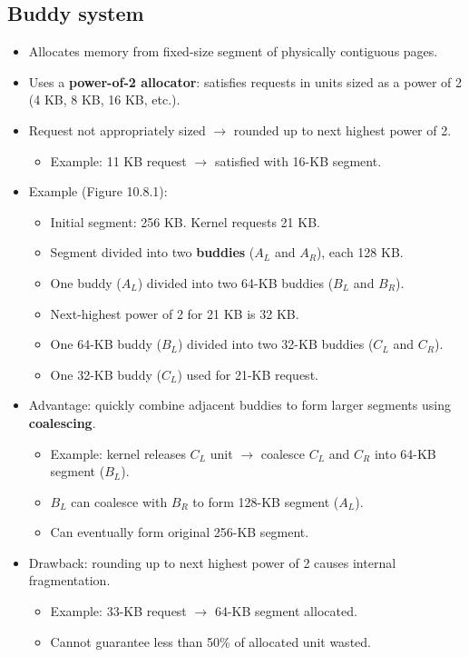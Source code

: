 \subsection{Buddy system}
\begin{itemize}
    \item Allocates memory from fixed-size segment of physically contiguous pages.
    \item Uses a \textbf{power-of-2 allocator}: satisfies requests in units sized as a power of 2 (4 KB, 8 KB, 16 KB, etc.).
    \item Request not appropriately sized $\rightarrow$ rounded up to next highest power of 2.
    \begin{itemize}
        \item Example: 11 KB request $\rightarrow$ satisfied with 16-KB segment.
    \end{itemize}
    \item Example (Figure 10.8.1):
    \begin{itemize}
        \item Initial segment: 256 KB. Kernel requests 21 KB.
        \item Segment divided into two \textbf{buddies} ($A_L$ and $A_R$), each 128 KB.
        \item One buddy ($A_L$) divided into two 64-KB buddies ($B_L$ and $B_R$).
        \item Next-highest power of 2 for 21 KB is 32 KB.
        \item One 64-KB buddy ($B_L$) divided into two 32-KB buddies ($C_L$ and $C_R$).
        \item One 32-KB buddy ($C_L$) used for 21-KB request.
    \end{itemize}
    \item Advantage: quickly combine adjacent buddies to form larger segments using \textbf{coalescing}.
    \begin{itemize}
        \item Example: kernel releases $C_L$ unit $\rightarrow$ coalesce $C_L$ and $C_R$ into 64-KB segment ($B_L$).
        \item $B_L$ can coalesce with $B_R$ to form 128-KB segment ($A_L$).
        \item Can eventually form original 256-KB segment.
    \end{itemize}
    \item Drawback: rounding up to next highest power of 2 causes internal fragmentation.
    \begin{itemize}
        \item Example: 33-KB request $\rightarrow$ 64-KB segment allocated.
        \item Cannot guarantee less than 50\% of allocated unit wasted.
    \end{itemize}
\end{itemize}

